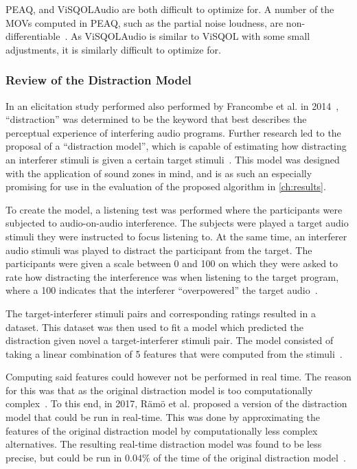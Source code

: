 PEAQ, and ViSQOLAudio are both difficult to optimize for.
A number of the MOVs computed in PEAQ, such as the partial noise loudness, are non-differentiable~\cite{thiede2000peaq}.
As ViSQOLAudio is similar to ViSQOL with some small adjustments, it is similarly difficult to optimize for.

\subsubsection{Review of the Distraction Model}
In an elicitation study performed also performed by Francombe et al. 
in 2014~\cite{francombe2014elicitation}, ``distraction'' was determined to be the keyword that 
best describes the perceptual experience of interfering audio programs.
Further research led to the proposal of a ``distraction model'', which is capable of estimating how distracting an 
interferer stimuli is given a certain target stimuli~\cite{francombe2015model}.
This model was designed with the application of sound zones in mind, and is as such an especially promising
for use in the evaluation of the proposed algorithm in \autoref{ch:results}.

To create the model, a listening test was performed where the participants were subjected to audio-on-audio interference.
The subjects were played a target audio stimuli they were instructed to focus listening to.
At the same time, an interferer audio stimuli was played to distract the participant from the target.
The participants were given a scale between 0 and 100 on which they were asked to rate how distracting the interference
was when listening to the target program, where a 100 indicates that the interferer ``overpowered'' 
the target audio~\cite{francombe2015model}.

The target-interferer stimuli pairs and corresponding ratings resulted in a dataset.
This dataset was then used to fit a model which predicted the distraction given novel a target-interferer stimuli pair.
The model consisted of taking a linear combination of 5 features that were 
computed from the stimuli~\cite{francombe2015model}.

Computing said features could however not be performed in real time.
The reason for this was that as the original distraction model is too computationally complex~\cite{ramo2017real}.
To this end, in 2017, R\"am\"o et al. proposed a version of the distraction model that could be run in real-time.
This was done by approximating the features of the original distraction model by computationally less complex alternatives.
The resulting real-time distraction model was found to be less precise, but could be run in 0.04\% of the time of the 
original distraction model~\cite{ramo2017real}.

